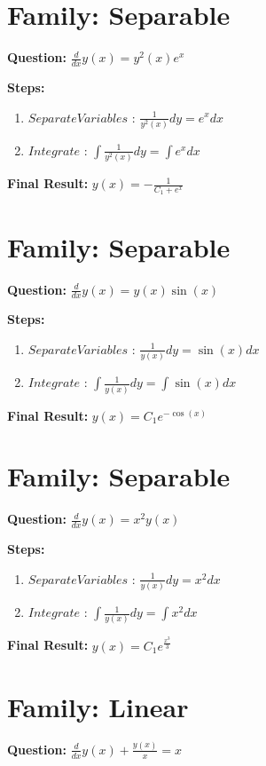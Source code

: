 \documentclass{article}
\begin{document}
\section*{Family: Separable}
\textbf{Question:} $\frac{d}{d x} y{\left(x \right)} = y^{2}{\left(x \right)} e^{x}$

\textbf{Steps:}
\begin{enumerate}
\item $Separate Variables$ :  $\frac{1}{y^{2}{\left(x \right)}} dy = e^{x} dx$
\item $Integrate$ :  $\int \frac{1}{y^{2}{\left(x \right)}} dy = \int e^{x} dx$
\end{enumerate}
\textbf{Final Result:} $y{\left(x \right)} = - \frac{1}{C_{1} + e^{x}}$

\section*{Family: Separable}
\textbf{Question:} $\frac{d}{d x} y{\left(x \right)} = y{\left(x \right)} \sin{\left(x \right)}$

\textbf{Steps:}
\begin{enumerate}
\item $Separate Variables$ :  $\frac{1}{y{\left(x \right)}} dy = \sin{\left(x \right)} dx$
\item $Integrate$ :  $\int \frac{1}{y{\left(x \right)}} dy = \int \sin{\left(x \right)} dx$
\end{enumerate}
\textbf{Final Result:} $y{\left(x \right)} = C_{1} e^{- \cos{\left(x \right)}}$

\section*{Family: Separable}
\textbf{Question:} $\frac{d}{d x} y{\left(x \right)} = x^{2} y{\left(x \right)}$

\textbf{Steps:}
\begin{enumerate}
\item $Separate Variables$ :  $\frac{1}{y{\left(x \right)}} dy = x^{2} dx$
\item $Integrate$ :  $\int \frac{1}{y{\left(x \right)}} dy = \int x^{2} dx$
\end{enumerate}
\textbf{Final Result:} $y{\left(x \right)} = C_{1} e^{\frac{x^{3}}{3}}$

\section*{Family: Linear}
\textbf{Question:} $\frac{d}{d x} y{\left(x \right)} + \frac{y{\left(x \right)}}{x} = x$
\end{document}
